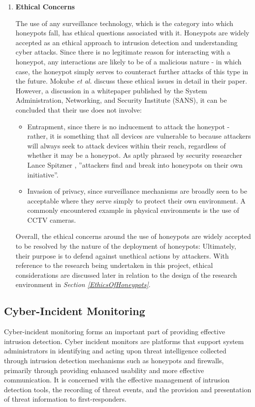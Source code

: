 \begin{enumerate}
	\item{\textbf{Ethical Concerns}}
    
 	The use of any surveillance technology, which is the category into which honeypots fall, has ethical questions associated with it. Honeypots are widely accepted as an ethical approach to intrusion detection and understanding cyber attacks. Since there is no legitimate reason for interacting with a honeypot, any interactions are likely to be of a malicious nature - in which case, the honeypot simply serves to counteract further attacks of this type in the	future. Mokube \textit{et al.} discuss these ethical issues in detail in their paper. \cite{Mokube:2007:HCA:1233341.1233399} However, a discussion in a whitepaper published by the System Administration, Networking, and Security Institute (SANS), \cite{SANSPreemptiveDeterrence} it can be concluded that their use does not involve:
 	
 	\begin{itemize}

 		\item Entrapment, since there is no inducement to attack the honeypot - rather, it is something that all devices are vulnerable to because attackers will always seek to attack devices within their reach, regardless of whether it may be a honeypot. As aptly phrased by security researcher Lance Spitzner \cite{HoneypotsAreTheyIllegalSpitzner}, ''attackers find and break into honeypots on their own initiative''.
 	
 		\item Invasion of privacy, since surveillance mechanisms are broadly seen to be acceptable where they serve simply to protect their own environment. A commonly encountered example in physical environments is the use of CCTV cameras.
 		
	\end{itemize}

		Overall, the ethical concerns around the use of honeypots are widely accepted to be resolved by the nature of the deployment of honeypots: Ultimately, their purpose is to defend against unethical actions by attackers. With reference to the research being undertaken in this project, ethical considerations are discussed later in relation to the design of the research environment in \textit{Section \ref{EthicsOfHoneypots}}.
\end{enumerate}

\subsection{Cyber-Incident Monitoring}
Cyber-incident monitoring forms an important part of providing effective intrusion detection. Cyber incident monitors are platforms that support system administrators in identifying and acting upon threat intelligence collected through intrusion detection mechanisms such as honeypots and firewalls, primarily through providing enhanced usability and more effective communication. It is concerned with the effective management of intrusion detection tools, the recording of threat events, and the provision and presentation of threat information to first-responders. 

